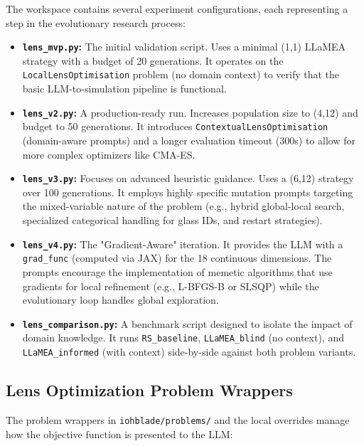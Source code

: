 \documentclass[a4paper,11pt]{article}
\begin{document}
The workspace contains several experiment configurations, each representing a step in the evolutionary research process:

\begin{itemize}
    \item \textbf{\texttt{lens\_mvp.py}:} The initial validation script. Uses a minimal (1,1) LLaMEA strategy with a budget of 20 generations. It operates on the \texttt{LocalLensOptimisation} problem (no domain context) to verify that the basic LLM-to-simulation pipeline is functional.
    \item \textbf{\texttt{lens\_v2.py}:} A production-ready run. Increases population size to (4,12) and budget to 50 generations. It introduces \texttt{ContextualLensOptimisation} (domain-aware prompts) and a longer evaluation timeout (300s) to allow for more complex optimizers like CMA-ES.
    \item \textbf{\texttt{lens\_v3.py}:} Focuses on advanced heuristic guidance. Uses a (6,12) strategy over 100 generations. It employs highly specific mutation prompts targeting the mixed-variable nature of the problem (e.g., hybrid global-local search, specialized categorical handling for glass IDs, and restart strategies).
    \item \textbf{\texttt{lens\_v4.py}:} The "Gradient-Aware" iteration. It provides the LLM with a \texttt{grad\_func} (computed via JAX) for the 18 continuous dimensions. The prompts encourage the implementation of memetic algorithms that use gradients for local refinement (e.g., L-BFGS-B or SLSQP) while the evolutionary loop handles global exploration.
    \item \textbf{\texttt{lens\_comparison.py}:} A benchmark script designed to isolate the impact of domain knowledge. It runs \texttt{RS\_baseline}, \texttt{LLaMEA\_blind} (no context), and \texttt{LLaMEA\_informed} (with context) side-by-side against both problem variants.
\end{itemize}

\subsection{Lens Optimization Problem Wrappers}

The problem wrappers in \texttt{iohblade/problems/} and the local overrides manage how the objective function is presented to the LLM:
\end{document}
